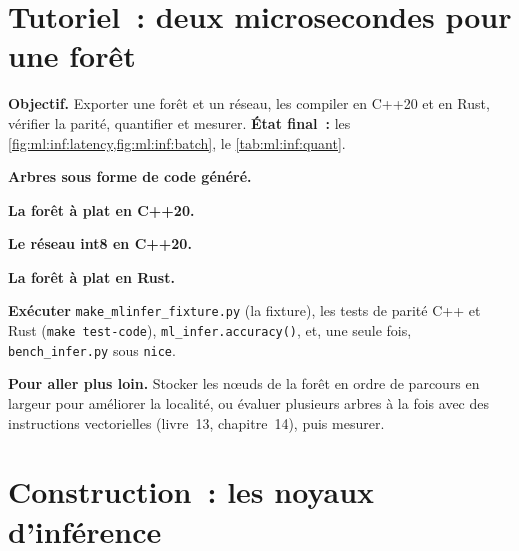 \section{Tutoriel~: deux microsecondes pour une forêt}\label{tut:ml:low-latency-inference:tut}

\begin{tutorial}
\textbf{Objectif.} Exporter une forêt et un réseau, les compiler en C++20 et en Rust, vérifier la parité, quantifier et mesurer.
\textbf{État final~:} les \cref{fig:ml:inf:latency,fig:ml:inf:batch}, le \cref{tab:ml:inf:quant}.
\begin{tutsteps}
\item \textbf{Arbres sous forme de code généré.}
\label{lst:ml:inf:gen}
\item \textbf{La forêt à plat en C++20.}
\label{lst:ml:inf:loop}
\item \textbf{Le réseau int8 en C++20.}
\label{lst:ml:inf:mlp}
\item \textbf{La forêt à plat en Rust.}
\label{lst:ml:inf:rust}
\item \textbf{Exécuter} \texttt{make\_mlinfer\_fixture.py} (la fixture), les tests de parité C++ et Rust (\texttt{make test-code}),
\texttt{ml\_infer.accuracy()}, et, une seule fois, \texttt{bench\_infer.py} sous \texttt{nice}.
\end{tutsteps}
\textbf{Pour aller plus loin.} Stocker les nœuds de la forêt en ordre de parcours en largeur pour améliorer la localité, ou évaluer plusieurs arbres
à la fois avec des instructions vectorielles (livre~13, chapitre~14), puis mesurer.
\end{tutorial}

\section{Construction~: les noyaux d'inférence}\label{bld:ml:low-latency-inference:mlinfer}

